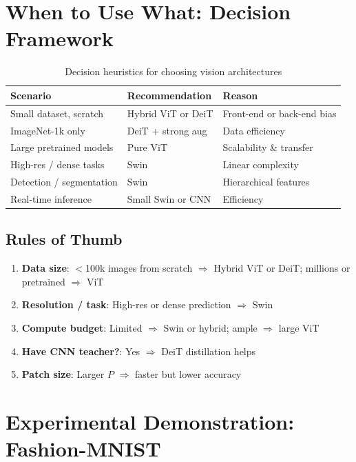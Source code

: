\documentclass{article}
\begin{document}
\section{When to Use What: Decision Framework}

\begin{table}[h]
\centering
\begin{tabular}{lll}
\toprule
\textbf{Scenario} & \textbf{Recommendation} & \textbf{Reason} \\
\midrule
Small dataset, scratch & Hybrid ViT or DeiT & Front-end or back-end bias \\
ImageNet-1k only & DeiT + strong aug & Data efficiency \\
Large pretrained models & Pure ViT & Scalability \& transfer \\
High-res / dense tasks & Swin & Linear complexity \\
Detection / segmentation & Swin & Hierarchical features \\
Real-time inference & Small Swin or CNN & Efficiency \\
\bottomrule
\end{tabular}
\caption{Decision heuristics for choosing vision architectures}
\end{table}

\subsection{Rules of Thumb}

\begin{enumerate}
\item \textbf{Data size}: $<$100k images from scratch $\Rightarrow$ Hybrid ViT or DeiT; millions or pretrained $\Rightarrow$ ViT
\item \textbf{Resolution / task}: High-res or dense prediction $\Rightarrow$ Swin
\item \textbf{Compute budget}: Limited $\Rightarrow$ Swin or hybrid; ample $\Rightarrow$ large ViT
\item \textbf{Have CNN teacher?}: Yes $\Rightarrow$ DeiT distillation helps
\item \textbf{Patch size}: Larger $P$ $\Rightarrow$ faster but lower accuracy
\end{enumerate}

\section{Experimental Demonstration: Fashion-MNIST}
\end{document}
